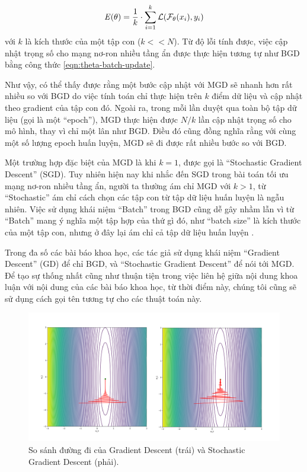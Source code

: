 \begin{equation}
	\label{eqn:E-minibatch}
	\mathbf{\it{E}(\theta)} = \frac{1}{k}\cdot \sum_{i=1}^{k}\mathcal{L}(\mathcal{F}_\theta( x_i), y_i)
\end{equation}
với $k$ là kích thước của một tập con ($k<<N$). Từ độ lỗi tính được, việc cập nhật trọng số cho mạng nơ-ron nhiều tầng ẩn được thực hiện tương tự như BGD bằng công thức \ref{eqn:theta-batch-update}.

Như vậy, có thể thấy được rằng một bước cập nhật với MGD sẽ nhanh hơn rất nhiều so với BGD do việc tính toán chỉ thực hiện trên $k$ điểm dữ liệu và cập nhật theo gradient của tập con đó. Ngoài ra, trong mỗi lần duyệt qua toàn bộ tập dữ liệu (gọi là một ``epoch''), MGD thực hiện được $N/k$ lần cập nhật trọng số cho mô hình, thay vì chỉ một lân như BGD. Điều đó cũng đồng nghĩa rằng với cùng một số lượng epoch huấn luyện, MGD sẽ đi được rất nhiều bước so với BGD.

Một trường hợp đặc biệt của MGD là khi $k=1$, được gọi là ``Stochastic Gradient Descent'' (SGD). Tuy nhiên hiện nay khi nhắc đến SGD trong bài toán tối ưu mạng nơ-ron nhiều tầng ẩn, người ta thường ám chỉ MGD với $k>1$, từ ``Stochastic'' ám chỉ cách chọn các tập con từ tập dữ liệu huấn luyện là ngẫu nhiên. Việc sử dụng khái niệm ``Batch'' trong BGD cũng dễ gây nhầm lẫn vì từ ``Batch'' mang ý nghĩa một tập hợp của thứ gì đó, như ``batch size'' là kích thước của một tập con, nhưng ở đây lại ám chỉ cả tập dữ liệu huấn luyện \cite{goodfellow2016deeplearning}.

Trong đa số các bài báo khoa học, các tác giả sử dụng khái niệm ``Gradient Descent'' (GD) để chỉ BGD, và ``Stochastic Gradient Descent'' để nói tới MGD. Để tạo sự thống nhất cũng như thuận tiện trong việc liên hệ giữa nội dung khoa luận với nội dung của các bài báo khoa học, từ thời điểm này, chúng tôi cũng sẽ sử dụng cách gọi tên tương tự cho các thuật toán này.

\begin{figure}[H]
	\centering
	\includegraphics[width=140 mm]{images/gd-sgd.png}
	\caption{So sánh đường đi của Gradient Descent (trái) và Stochastic Gradient Descent (phải).}
	\label{fig:gd-sgd}
\end{figure}

